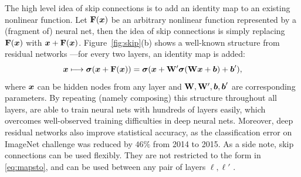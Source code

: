 The high level idea of skip connections is to add an identity map to an existing nonlinear function. Let $\mathrm{\bf F}(\text{\boldmath $x$})$ be an arbitrary nonlinear function represented by a (fragment of) neural net, then the idea of skip connections is simply replacing $\mathrm{\bf F}(\text{\boldmath $x$})$ with $\text{\boldmath $x$} + \mathrm{\bf F}(\text{\boldmath $x$})$. Figure~\ref{fig:skip}(b) shows a well-known structure from residual networks \citep{he2016deep}---for every two layers, an identity map is added:
\begin{equation}\label{eq:mapsto}
\text{\boldmath $x$} \longmapsto \bm{\sigma}(\text{\boldmath $x$} + \mathrm{\bf F}(\text{\boldmath $x$})) = \bm{\sigma}(\text{\boldmath $x$} + \mathrm{\bf W}' \bm{\sigma}(\mathrm{\bf W} \text{\boldmath $x$} + \text{\boldmath $b$}) + \text{\boldmath $b$}'),
\end{equation}
where $\text{\boldmath $x$}$ can be hidden nodes from any layer and $\mathrm{\bf W}, \mathrm{\bf W}', \text{\boldmath $b$}, \text{\boldmath $b$}'$ are corresponding parameters. By repeating (namely composing) this structure throughout all layers, \cite{he2016deep, he2016identity} are able to train neural nets with hundreds of layers easily, which overcomes well-observed training difficulties in deep neural nets. Moreover, deep residual networks also improve statistical accuracy, as the classification error on ImageNet challenge was reduced by $46\%$ from 2014 to 2015. As a side note, skip connections can be used flexibly. %
They are not restricted to the form in \eqref{eq:mapsto}, and can be used between any pair of layers $\ell, \ell'$ \citep{Huang17}. 



